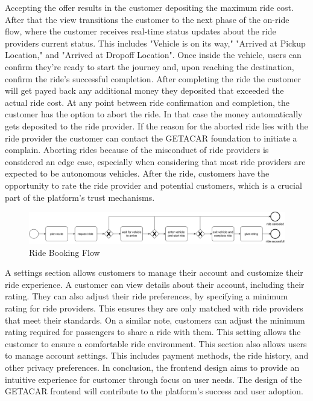 Accepting the offer results in the customer depositing the maximum ride cost. After that the view  transitions the customer to the next phase of the on-ride flow, where the customer receives real-time status updates about the ride providers current status. This includes "Vehicle is on its way," "Arrived at Pickup Location," and "Arrived at Dropoff Location". Once inside the vehicle, users can confirm they're ready to start the journey and, upon reaching the destination, confirm the ride's successful completion. After completing the ride the customer will get payed back any additional money they deposited that exceeded the actual ride cost. At any point between ride confirmation and completion, the customer has the option to abort the ride. In that case the money automatically gets deposited to the ride provider. If the reason for the aborted ride lies with the ride provider the customer can contact the GETACAR foundation to initiate a complain. Aborting rides because of the misconduct of ride providers is considered an edge case, especially when considering that most ride providers are expected to be autonomous vehicles.  After the ride, customers have the opportunity to rate the ride provider and potential customers, which is a crucial part of the platform's trust mechanisms.

\begin{figure}[h]
    \centering
    \includegraphics[width=\linewidth]{data/3.svg}
    \caption{Ride Booking Flow}
    \label{fig:directSVG}
\end{figure}

A settings section allows customers to manage their account and customize their ride experience. A customer can view details about their account, including their rating. They can also adjust their ride preferences, by specifying a minimum rating for ride providers. This ensures they are only matched with ride providers that meet their standards. On a similar note, customers can adjust the minimum rating required for passengers to share a ride with them. This setting allows the customer to ensure a comfortable ride environment. This section also allows users to manage account settings. This includes payment methods, the ride history, and other privacy preferences. In conclusion, the frontend design aims to provide an intuitive experience for customer through focus on user needs. The design of the GETACAR frontend will contribute to the platform's success and user adoption.

